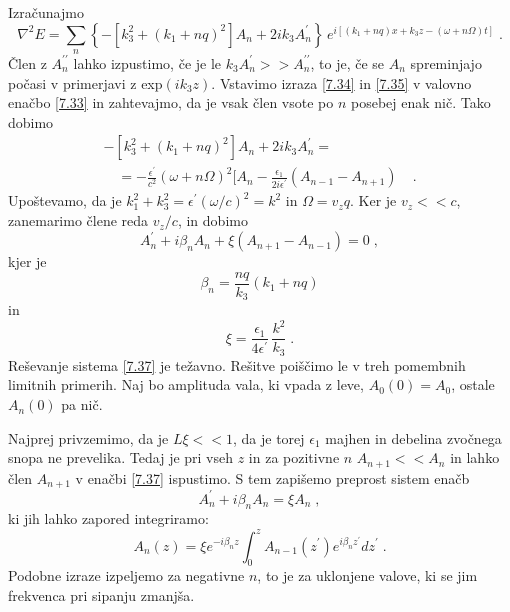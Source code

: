 Izračunajmo 
\begin{equation}
\nabla^{2}E=\sum_{n}\left\{ -[k_{3}^{2}+(k_{1}+nq)^{2}]A_{n}+2ik_{3}A_{n}^{\prime}\right\} \, e^{i[(k_{1}+nq)x+k_{3}z-(\omega+n\Omega)t]}\;.\label{7.35}
\end{equation}
 Člen z $A_{n}^{\prime\prime}$ lahko izpustimo, če je le $k_{3}A_{n}^{\prime}>>A_{n}^{\prime\prime}$,
to je, če se $A_{n}$ spreminjajo počasi v primerjavi z exp$(ik_{3}z)$.
Vstavimo izraza \ref{7.34} in \ref{7.35} v valovno enačbo \ref{7.33}
in zahtevajmo, da je vsak člen vsote po $n$ posebej enak nič. Tako
dobimo 
\begin{eqnarray}
-[k_{3}^{2}+(k_{1}+nq)^{2}]A_{n}+2ik_{3}A_{n}^{\prime}=\nonumber \\
\quad=-\frac{\epsilon^{\prime}}{c^{2}}(\omega+n\Omega)^{2}[A_{n}-
\frac{\epsilon_{1}}{2i\epsilon^{\prime}}(A_{n-1}-A_{n+1}) & \;.
\end{eqnarray}
 Upoštevamo, da je $k_{1}^{2}+k_{3}^{2}=\epsilon^{\prime}(\omega/c)^{2}=k^{2}$
in $\Omega=v_{z}q$. Ker je $v_{z}<<c$, zanemarimo člene reda $v_{z}/c$,
in dobimo 
\begin{equation}
A_{n}^{\prime}+i\beta_{n}A_{n}+\xi(A_{n+1}-A_{n-1})=0\;,\label{7.37}
\end{equation}
 kjer je 
\begin{equation}
\beta_{n}=\frac{nq}{k_{3}}(k_{1}+nq)\label{7.38}
\end{equation}
 in 
\begin{equation}
\xi=\frac{\epsilon_{1}}{4\epsilon^{\prime}}\,\frac{k^{2}}{k_{3}}\;.\label{7.39}
\end{equation}
 Reševanje sistema \ref{7.37} je težavno. Rešitve poiščimo le v treh
pomembnih limitnih primerih. Naj bo amplituda vala, ki vpada z leve,
$A_{0}(0)=A_{0}$, ostale $A_{n}(0)$ pa nič.

Najprej privzemimo, da je $L\xi<<1$, da je torej $\epsilon_{1}$
majhen in debelina zvočnega snopa ne prevelika. Tedaj je pri vseh
$z$ in za pozitivne $n$ $A_{n+1}<<A_{n}$ in lahko člen $A_{n+1}$
v enačbi \ref{7.37} ispustimo. S tem zapišemo preprost sistem enačb
\begin{equation}
A_{n}^{\prime}+i\beta_{n}A_{n}=\xi A_{n}\;,\label{7.40}
\end{equation}
 ki jih lahko zapored integriramo: 
\begin{equation}
A_{n}(z)=\xi e^{-i\beta_{n}z}\int_{0}^{z}A_{n-1}(z^{\prime})
e^{i\beta_{n}z^{\prime}}dz^{\prime}\;.\label{7.41}
\end{equation}
 Podobne izraze izpeljemo za negativne $n$, to je za uklonjene valove,
ki se jim frekvenca pri sipanju zmanjša.

